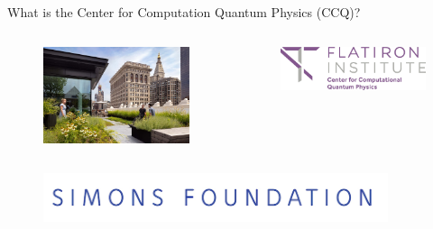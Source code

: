 \begin{frame}{What is the Center for Computation Quantum Physics (CCQ)?}

\begin{columns}


  \begin{column}[T]{0.5\textwidth}%
    \begin{figure}[T]
      \includegraphics[width=1.0\textwidth]{
        slides/assets/what-is-ccq-flatiron-institute-rooftop.jpg
      }
    \end{figure}
  \end{column}

  \begin{column}[T]{0.5\textwidth}

    \vspace*{1.2cm}

    \begin{figure}[T]
      \centering
      \includegraphics[width=1.0\textwidth]{
        slides/assets/who-am-i-flatiron-institute-ccq.jpg
      }
    \end{figure}
  \end{column}

\end{columns}

\begin{figure}[T]
  \includegraphics[width=0.9\textwidth]{
    slides/assets/what-is-ccq-simons-foundation.jpg
  }
\end{figure}

\end{frame}
